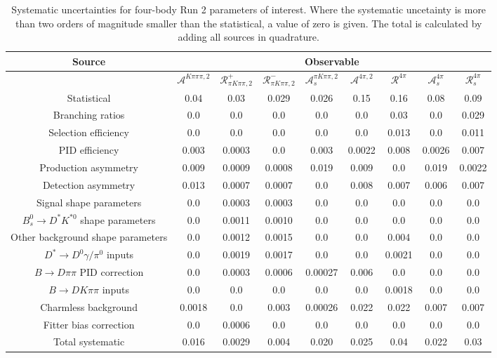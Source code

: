 \begin{sidewaystable}
  \centering
  \begin{tabular}{ccccccccc}
      \toprule
      Source & \multicolumn{8}{c}{Observable} \\
      \midrule
       & $\mathcal{A}^{K\pi\pi\pi,2}$ & $\mathcal{R}_{\pi K\pi\pi,2}^+$ & $\mathcal{R}_{\pi K\pi\pi,2}^-$ & $\mathcal{A}_s^{\pi K\pi\pi,2}$ & $\mathcal{A}^{4\pi,2}$ & $\mathcal{R}^{4\pi}$ & $\mathcal{A}_s^{4\pi}$ & $\mathcal{R}_{s}^{4\pi}$ \\
      \midrule
      Statistical & 0.04 & 0.03 & 0.029 & 0.026 & 0.15 & 0.16 & 0.08 & 0.09 \\
      \midrule
      Branching ratios & 0.0  & 0.0  & 0.0  & 0.0  & 0.0  & 0.03 & 0.0  & 0.029 \\
      Selection efficiency & 0.0  & 0.0  & 0.0  & 0.0  & 0.0  & 0.013 & 0.0  & 0.011 \\
      PID efficiency & 0.003 & 0.0003 & 0.0  & 0.003 & 0.0022 & 0.008 & 0.0026 & 0.007 \\
      Production asymmetry & 0.009 & 0.0009 & 0.0008 & 0.019 & 0.009 & 0.0  & 0.019 & 0.0022 \\
      Detection asymmetry & 0.013 & 0.0007 & 0.0007 & 0.0  & 0.008 & 0.007 & 0.006 & 0.007 \\
      Signal shape parameters & 0.0  & 0.0003 & 0.0003 & 0.0  & 0.0  & 0.0  & 0.0  & 0.0  \\
      $B^0_s \to D^* K^{*0}$ shape parameters & 0.0  & 0.0011 & 0.0010 & 0.0  & 0.0  & 0.0  & 0.0  & 0.0  \\
      Other background shape parameters & 0.0  & 0.0012 & 0.0015 & 0.0  & 0.0  & 0.004 & 0.0  & 0.0  \\
      $D^* \to D^0 \gamma/\pi^0$ inputs & 0.0  & 0.0019 & 0.0017 & 0.0  & 0.0  & 0.0021 & 0.0  & 0.0  \\
      $B\to D\pi\pi$ PID correction & 0.0  & 0.0003 & 0.0006 & 0.00027 & 0.006 & 0.0  & 0.0  & 0.0  \\
      $B\to DK\pi\pi$ inputs & 0.0  & 0.0  & 0.0  & 0.0  & 0.0  & 0.0018 & 0.0  & 0.0  \\
      Charmless background & 0.0018 & 0.0  & 0.003 & 0.00026 & 0.022 & 0.022 & 0.007 & 0.007 \\
      Fitter bias correction & 0.0  & 0.0006 & 0.0  & 0.0  & 0.0  & 0.0  & 0.0  & 0.0  \\
      \midrule
      Total systematic & 0.016 & 0.0029 & 0.004 & 0.020 & 0.025 & 0.04 & 0.022 & 0.03 \\
      \bottomrule
  \end{tabular}
  \caption{Systematic uncertainties for four-body Run 2 parameters of interest. Where the systematic uncetainty is more than two orders of magnitude smaller than the statistical, a value of zero is given. The total is calculated by adding all sources in quadrature.}
\label{tab:fourBody_run2_systematics}
\end{sidewaystable}
